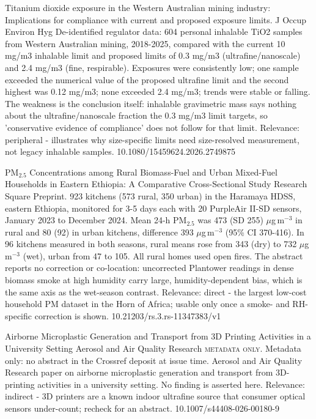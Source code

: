 \documentclass[10pt]{article}
\begin{document}
\par{}\baselineskip{}\baselineskip
{}

{Titanium dioxide exposure in the Western Australian mining industry: Implications for compliance with current and proposed exposure limits.}
{J Occup Environ Hyg}
{De-identified regulator data: 604 personal inhalable TiO2 samples from Western Australian mining, 2018-2025, compared with the current 10 mg/m3 inhalable limit and proposed limits of 0.3 mg/m3 (ultrafine/nanoscale) and 2.4 mg/m3 (fine, respirable). Exposures were consistently low; one sample exceeded the numerical value of the proposed ultrafine limit and the second highest was 0.12 mg/m3; none exceeded 2.4 mg/m3; trends were stable or falling. The weakness is the conclusion itself: inhalable gravimetric mass says nothing about the ultrafine/nanoscale fraction the 0.3 mg/m3 limit targets, so 'conservative evidence of compliance' does not follow for that limit. Relevance: peripheral - illustrates why size-specific limits need size-resolved measurement, not legacy inhalable samples.}
{10.1080/15459624.2026.2749875}

{PM$_{2.5}$ Concentrations among Rural Biomass-Fuel and Urban Mixed-Fuel Households in Eastern Ethiopia: A Comparative Cross-Sectional Study}
{Research Square}
{Preprint. 923 kitchens (573 rural, 350 urban) in the Haramaya HDSS, eastern Ethiopia, monitored for 3-5 days each with 20 PurpleAir II-SD sensors, January 2023 to December 2024. Mean 24-h PM$_{2.5}$ was 473 (SD 255) $\mu$g\,m$^{-3}$ in rural and 80 (92) in urban kitchens, difference 393 $\mu$g\,m$^{-3}$ (95\% CI 370-416). In 96 kitchens measured in both seasons, rural means rose from 343 (dry) to 732 $\mu$g\,m$^{-3}$ (wet), urban from 47 to 105. All rural homes used open fires. The abstract reports no correction or co-location: uncorrected Plantower readings in dense biomass smoke at high humidity carry large, humidity-dependent bias, which is the same axis as the wet-season contrast. Relevance: direct - the largest low-cost household PM dataset in the Horn of Africa; usable only once a smoke- and RH-specific correction is shown.}
{10.21203/rs.3.rs-11347383/v1}

{Airborne Microplastic Generation and Transport from 3D Printing Activities in a University Setting}
{Aerosol and Air Quality Research}
{\textsc{metadata only.} Metadata only: no abstract in the Crossref deposit at issue time. Aerosol and Air Quality Research paper on airborne microplastic generation and transport from 3D-printing activities in a university setting. No finding is asserted here. Relevance: indirect - 3D printers are a known indoor ultrafine source that consumer optical sensors under-count; recheck for an abstract.}
{10.1007/s44408-026-00180-9}
\end{document}
